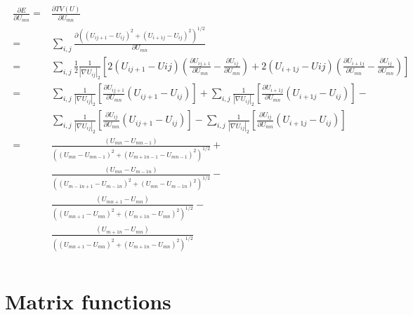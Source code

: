 \documentclass[a4paper]{article}
\begin{document}
\begin{align}
\begin{split}
\frac{\partial{E}}{\partial{U_{mn}}} = & \frac{\partial{TV(U)}}{\partial{U_{mn}}} \\
 = & \sum_{i,j} \frac{\partial \left ( \left ( U_{ij+1}-U_{ij}\right )^2 + \left ( U_{i+1j}-U_{ij}\right )^2 \right )^{1/2}}{\partial U_{mn}}\\
  = & \sum_{i,j} \frac{1}{2}\frac{1}{ \left | \nabla U_{ij} \right |_2}\left [ 2(U_{ij+1}-U{ij})(\frac{\partial U_{ij+1}}{\partial U_{mn}} - \frac{\partial U_{ij}}{\partial U_{mn}}) + 2(U_{i+1j}-U{ij})(\frac{\partial U_{i+1j}}{\partial U_{mn}} - \frac{\partial U_{ij}}{\partial U_{mn}}) \right ] \\
  = & 
  \sum_{i,j}  \frac{1}{ \left | \nabla U_{ij} \right |_2}
  \left [ \frac{\partial U_{ij+1}}{\partial U_{mn}}\left ( U_{ij+1}-U_{ij} \right )\right] + 
  \sum_{i,j}  \frac{1}{ \left | \nabla U_{ij} \right |_2} 
  \left [\frac{\partial U_{i+1j}}{\partial U_{mn}} \left (U_{i+1j}-U_{ij} \right ) \right] -\\
   & \sum_{i,j}  \frac{1}{ \left | \nabla U_{ij} \right |_2}
   \left [ \frac{\partial U_{ij}}{\partial U_{mn}} \left ( U_{ij+1}-U_{ij}\right ) \right] - 
   \sum_{i,j}  \frac{1}{ \left | \nabla U_{ij} \right |_2}
   \left [ \frac{\partial U_{ij}}{\partial U_{mn}} \left ( U_{i+1j}-U_{ij}\right ) \right]\\
  = & \frac{\left (U_{mn}-U_{mn-1} \right )}{ \left (\left ( U_{mn}-U_{mn-1}\right )^2 + \left ( U_{m+1n-1}-U_{mn-1}\right )^2 \right )^{1/2}} + \\
    & \frac{\left (U_{mn}-U_{m-1n} \right )}{ \left (\left ( U_{m-1n+1}-U_{m-1n}\right )^2 + \left ( U_{mn}-U_{m-1n}\right )^2 \right )^{1/2}} -\\
    & \frac{\left (U_{mn+1}-U_{mn} \right )}{ \left (\left ( U_{mn+1}-U_{mn}\right )^2 + \left ( U_{m+1n}-U_{mn}\right )^2 \right )^{1/2}} -\\
    & \frac{\left (U_{m+1n}-U_{mn} \right )}{ \left (\left ( U_{mn+1}-U_{mn}\right )^2 + \left ( U_{m+1n}-U_{mn}\right )^2 \right )^{1/2}} \\
\end{split}
\end{align}

\newpage
\section{Matrix functions}
\end{document}
